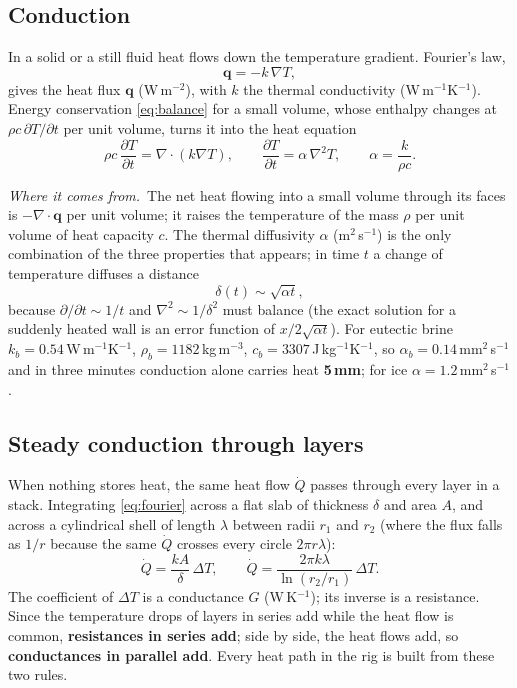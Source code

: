 \documentclass[11pt,a4paper]{article}
\newcommand{\where}{\par\noindent\textit{Where it comes from.}\ }
\begin{document}
\subsection{Conduction}
\label{sec:conduction}
In a solid or a still fluid heat flows down the temperature gradient. Fourier's law,
\begin{equation}
\mathbf q = -k\,\nabla T ,
\label{eq:fourier}
\end{equation}
gives the heat flux $\mathbf q$ (W\,m$^{-2}$), with $k$ the thermal conductivity (W\,m$^{-1}$K$^{-1}$).
Energy conservation \eqref{eq:balance} for a small volume, whose enthalpy changes at
$\rho c\,\partial T/\partial t$ per unit volume, turns it into the heat equation
\begin{equation}
\rho c\,\frac{\partial T}{\partial t} = \nabla\cdot(k\nabla T),\qquad
\frac{\partial T}{\partial t} = \alpha\,\nabla^2 T,\qquad \alpha = \frac{k}{\rho c}.
\label{eq:heateq}
\end{equation}
\where The net heat flowing into a small volume through its faces is $-\nabla\cdot\mathbf q$ per unit
volume; it raises the temperature of the mass $\rho$ per unit volume of heat capacity $c$. The
thermal diffusivity $\alpha$ (m$^2$\,s$^{-1}$) is the only combination of the three properties that
appears; in time $t$ a change of temperature diffuses a distance
\begin{equation}
\delta(t) \sim \sqrt{\alpha t},
\label{eq:difflength}
\end{equation}
because $\partial/\partial t \sim 1/t$ and $\nabla^2 \sim 1/\delta^2$ must balance (the exact solution
for a suddenly heated wall is an error function of $x/2\sqrt{\alpha t}$). For eutectic brine
$k_b = 0.54$\,W\,m$^{-1}$K$^{-1}$, $\rho_b = 1182$\,kg\,m$^{-3}$, $c_b = 3307$\,J\,kg$^{-1}$K$^{-1}$, so
$\alpha_b = 0.14$\,mm$^2$\,s$^{-1}$ and in three minutes conduction alone carries heat \textbf{5\,mm}; for
ice $\alpha = 1.2$\,mm$^2$\,s$^{-1}$.

\subsection{Steady conduction through layers}
\label{sec:layers}
When nothing stores heat, the same heat flow $\dot Q$ passes through every layer in a stack.
Integrating \eqref{eq:fourier} across a flat slab of thickness $\delta$ and area $A$, and across a
cylindrical shell of length $\lambda$ between radii $r_1$ and $r_2$ (where the flux falls as $1/r$
because the same $\dot Q$ crosses every circle $2\pi r\lambda$):
\begin{equation}
\dot Q = \frac{kA}{\delta}\,\Delta T,
\qquad
\dot Q = \frac{2\pi k\lambda}{\ln(r_2/r_1)}\,\Delta T .
\label{eq:slabcyl}
\end{equation}
The coefficient of $\Delta T$ is a conductance $G$ (W\,K$^{-1}$); its inverse is a resistance. Since the
temperature drops of layers in series add while the heat flow is common, \textbf{resistances in series
add}; side by side, the heat flows add, so \textbf{conductances in parallel add}. Every heat path in
the rig is built from these two rules.
\end{document}
